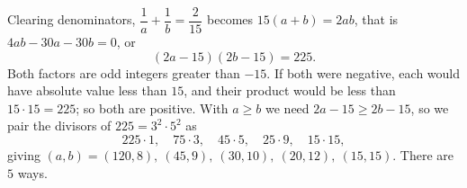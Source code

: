 Clearing denominators, $\dfrac{1}{a}+\dfrac{1}{b}=\dfrac{2}{15}$ becomes $15(a+b)=2ab$, that is $4ab-30a-30b=0$, or
\[
(2a-15)(2b-15)=225 .
\]
Both factors are odd integers greater than $-15$. If both were negative, each would have absolute value less than $15$, and their product would be less than $15\cdot15=225$; so both are positive. With $a\ge b$ we need $2a-15\ge 2b-15$, so we pair the divisors of $225=3^2\cdot5^2$ as
\[
225\cdot1,\quad 75\cdot3,\quad 45\cdot5,\quad 25\cdot9,\quad 15\cdot15,
\]
giving $(a,b)=(120,8),\ (45,9),\ (30,10),\ (20,12),\ (15,15)$. There are $\boxed{5}$ ways.
